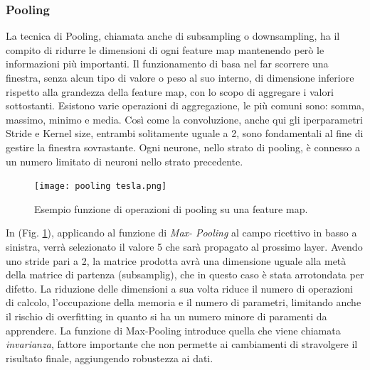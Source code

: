 \subsubsection{Pooling}
La tecnica di Pooling, chiamata anche di subsampling o downsampling, ha 
il compito di ridurre le dimensioni di ogni feature map mantenendo però 
le informazioni più importanti. Il funzionamento di basa nel far scorrere 
una finestra, senza alcun tipo di valore o peso al suo interno, di dimensione 
inferiore rispetto alla grandezza della feature map, con lo scopo di aggregare 
i valori sottostanti. Esistono varie operazioni di aggregazione, le più comuni 
sono: somma, massimo, minimo e media. Così come la convoluzione, anche 
qui gli iperparametri Stride e Kernel size, entrambi solitamente uguale 
a 2, sono fondamentali al fine di gestire la finestra sovrastante. Ogni 
neurone, nello strato di pooling, è connesso a un numero limitato di neuroni 
nello strato precedente.
\begin{figure}
    \centering
    \texttt{[image: pooling tesla.png]}
    \centering
    \caption{Esempio funzione di operazioni di pooling su una feature map.}
    \label{pooling}
\end{figure}
In (Fig. \ref{pooling}), applicando al funzione di \emph{Max-
Pooling} al campo ricettivo in 
basso a sinistra, verrà selezionato il valore 
5 che sarà propagato al prossimo layer. Avendo uno stride pari a 2, la 
matrice prodotta avrà una dimensione uguale alla metà della matrice di 
partenza (subsamplig),  che in questo caso è stata arrotondata per difetto. 
La riduzione delle dimensioni a sua volta riduce il numero di operazioni di 
calcolo, l'occupazione della memoria e il numero di parametri, limitando 
anche il rischio di overfitting in quanto si ha un numero minore di paramenti 
da apprendere. La funzione di Max-Pooling introduce quella che viene 
chiamata \emph{invarianza}, fattore importante che non permette ai cambiamenti 
di stravolgere il risultato finale, aggiungendo robustezza ai dati.

